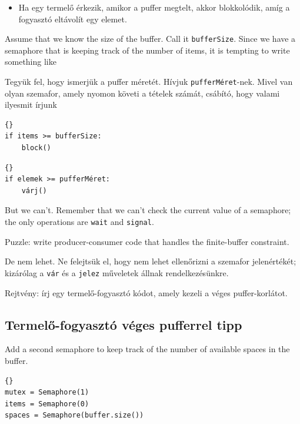 \documentclass{book}
\newcommand{\clearemptydoublepage}{\newpage\cleardoublepage}
\begin{document}
\begin{itemize}

\item Ha egy termelő érkezik, amikor a puffer megtelt, akkor blokkolódik,
amíg a fogyasztó eltávolít egy elemet.

\end{itemize}

Assume that we know the size of the buffer.  Call it
{\tt bufferSize}.  Since we have a semaphore that is keeping
track of the number of items, it is tempting to write something
like 

Tegyük fel, hogy ismerjük a puffer méretét.  Hívjuk
{\tt pufferMéret}-nek.  Mivel van olyan szemafor, amely nyomon követi a tételek számát,
csábító, hogy valami ilyesmit írjunk

\begin{lstlisting}[title={Broken finite buffer solution}]{}
if items >= bufferSize:
    block()
\end{lstlisting}

\begin{lstlisting}[title={Elrontott véges puffer megoldás}]{}
if elemek >= pufferMéret:
    várj()
\end{lstlisting}

But we can't.  Remember that we can't check the current
value of a semaphore; the only operations are {\tt wait}
and {\tt signal}.

Puzzle: write producer-consumer code that handles the finite-buffer
constraint.

De nem lehet. Ne felejtsük el, hogy nem lehet ellenőrizni a
szemafor jelenértékét; kizárólag a {\tt vár} és a {\tt jelez}
műveletek állnak rendelkezésünkre.

Rejtvény: írj egy termelő-fogyasztó kódot, amely kezeli a véges puffer-korlátot.

\clearemptydoublepage
\subsection{Termelő-fogyasztó véges pufferrel tipp}

Add a second semaphore to keep track of the number of
available spaces in the buffer.

\begin{lstlisting}[title={Finite-buffer producer-consumer initialization}]{}
mutex = Semaphore(1)
items = Semaphore(0)
spaces = Semaphore(buffer.size())
\end{lstlisting}
\end{document}
